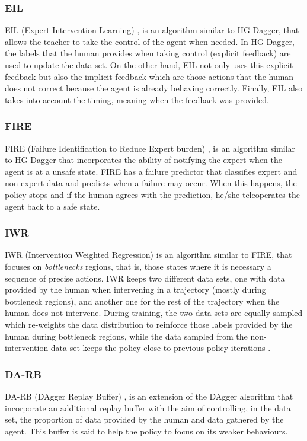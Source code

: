 \subsubsection*{EIL}
EIL (Expert Intervention Learning) \cite{EIL-Spencer:2020}, is an algorithm similar to HG-Dagger, that allows the teacher to take the control of the agent when needed. In HG-Dagger,  the labels that the human provides when taking control (explicit feedback) are used to update the data set. On the other hand, EIL not only uses this explicit feedback but also the implicit feedback which are those actions that the human does not correct because the agent is already behaving correctly. Finally, EIL also takes into account the timing, meaning when the feedback was provided.

\subsubsection*{FIRE}
FIRE (Failure Identification to Reduce Expert burden) \cite{FIRE-ablett:2020}, is an algorithm similar to HG-Dagger that incorporates the ability of notifying the expert when the agent is at a unsafe state. FIRE has a  failure predictor that classifies expert and non-expert data and predicts when a failure may occur. When this happens, the policy stops and if the human agrees with the prediction, he/she teleoperates the agent back to a safe state.

\subsubsection*{IWR}
IWR (Intervention Weighted Regression) \cite{IWR-mandlekar:2020} is an algorithm similar to FIRE, that focuses on \textit{bottlenecks} regions, that is, those states where it is necessary a sequence of precise actions. IWR keeps two different data sets, one with data provided by the human when intervening in a trajectory (mostly during bottleneck regions), and another one for the rest of the trajectory when the human does not intervene. During training, the two data sets are equally sampled which re-weights  the data distribution to reinforce those labels provided by the human  during bottleneck regions, while the data sampled from the non-intervention data set
keeps the policy close to previous policy iterations \cite{IWR-mandlekar:2020} .



\subsubsection*{DA-RB}
DA-RB (DAgger Replay Buffer) \cite{DA-RB-Prakash:2020}, is an extension of the DAgger algorithm \cite{DAgger-Ross:2011} that incorporate an additional replay buffer with the aim of controlling, in the data set, the proportion of data provided by the human and data gathered by the agent. This buffer is said to help the policy to focus on its weaker behaviours.




